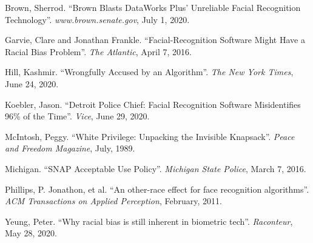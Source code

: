 \documentclass[12pt, letterpaper]{article}
\begin{document}
\begin{mla}
\begin{workscited}
	\bibent Brown, Sherrod. ``Brown Blasts DataWorks Plus' Unreliable Facial
	Recognition Technology''. \textit{www.brown.senate.gov}, July 1, 2020.

	\bibent Garvie, Clare and Jonathan Frankle. ``Facial-Recognition Software
	Might Have a Racial Bias Problem''. \textit{The Atlantic}, April 7, 2016.

	\bibent Hill, Kashmir. ``Wrongfully Accused by an Algorithm''.
	\textit{The New York Times}, June 24, 2020.
	
	\bibent Koebler, Jason. ``Detroit Police Chief: Facial Recognition
	Software Misidentifies 96\% of the Time''. \textit{Vice}, June 29, 2020.
	
	\bibent McIntosh, Peggy. ``White Privilege: Unpacking the Invisible
	Knapsack''. \textit{Peace and Freedom Magazine}, July, 1989.
	
	\bibent Michigan. ``SNAP Acceptable Use Policy''. \textit{Michigan State
	Police}, March 7, 2016.
	
	\bibent Phillips, P. Jonathon, et al. ``An other-race effect for face
	recognition algorithms''. \textit{ACM Transactions on Applied Perception},
	February, 2011.
	
	\bibent Yeung, Peter. ``Why racial bias is still inherent in biometric
	tech''. \textit{Raconteur}, May 28, 2020.
\end{workscited}




\end{mla}
\end{document}
